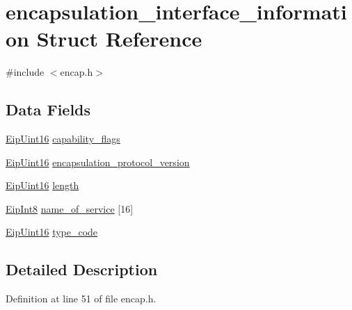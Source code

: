 \hypertarget{structencapsulation__interface__information}{\section{encapsulation\-\_\-interface\-\_\-information \-Struct \-Reference}
\label{d0/d6e/structencapsulation__interface__information}
}


{\ttfamily \#include $<$encap.\-h$>$}

\subsection*{\-Data \-Fields}
\begin{DoxyCompactItemize}
\item 
\hyperlink{typedefs_8h_ac1b4cfa25b4f5def62f23b455dd395d8}{\-Eip\-Uint16} \hyperlink{structencapsulation__interface__information_a4b05e4dd9594531622245c89b28833a0}{capability\-\_\-flags}
\item 
\hyperlink{typedefs_8h_ac1b4cfa25b4f5def62f23b455dd395d8}{\-Eip\-Uint16} \hyperlink{structencapsulation__interface__information_a8c202a5bccd134008359a0d9549bd072}{encapsulation\-\_\-protocol\-\_\-version}
\item 
\hyperlink{typedefs_8h_ac1b4cfa25b4f5def62f23b455dd395d8}{\-Eip\-Uint16} \hyperlink{structencapsulation__interface__information_a8fb3a6cdadccfbb2abfc364afd444370}{length}
\item 
\hyperlink{typedefs_8h_a662b37f7ae221f61eb9b0455086ac850}{\-Eip\-Int8} \hyperlink{structencapsulation__interface__information_adf21ea364f65cb0d7988bf094bc1c471}{name\-\_\-of\-\_\-service} \mbox{[}16\mbox{]}
\item 
\hyperlink{typedefs_8h_ac1b4cfa25b4f5def62f23b455dd395d8}{\-Eip\-Uint16} \hyperlink{structencapsulation__interface__information_af37bc735455105810324d3caf470bcf0}{type\-\_\-code}
\end{DoxyCompactItemize}


\subsection{\-Detailed \-Description}


\-Definition at line 51 of file encap.\-h.



